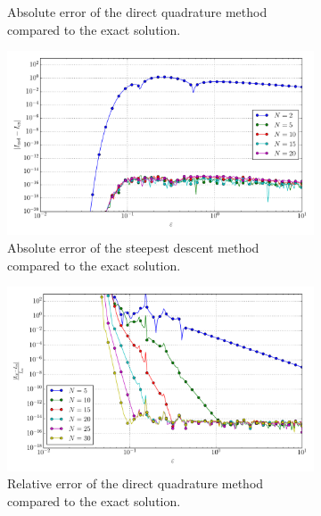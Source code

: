 \documentclass[a4paper,10pt]{article}
\begin{document}
\begin{figure}[ht!]
\begin{subfigure}[t]{0.5\linewidth}
    \caption{Absolute error of the direct quadrature method compared to the exact solution.}
    \label{fig:tp_2d_conv_eps_23_22_err_qr}
  \end{subfigure}
  \begin{subfigure}[t]{0.5\linewidth}
    \includegraphics[width=\linewidth]{./plots/tp_2d_conv_eps_(2,3)_(2,2)_err_nsd.pdf}
    \caption{Absolute error of the steepest descent method compared to the exact solution.}
    \label{fig:tp_2d_conv_eps_23_22_err_nsd}
  \end{subfigure}
  \begin{subfigure}[t]{0.5\linewidth}
    \includegraphics[width=\linewidth]{./plots/tp_2d_conv_eps_(2,3)_(2,2)_err_rel_qr.pdf}
    \caption{Relative error of the direct quadrature method compared to the exact solution.}
    \label{fig:tp_2d_conv_eps_23_22_err_rel_qr}
  \end{subfigure}
  \begin{subfigure}[t]{0.5\linewidth}

\end{subfigure}
\end{figure}
\end{document}

